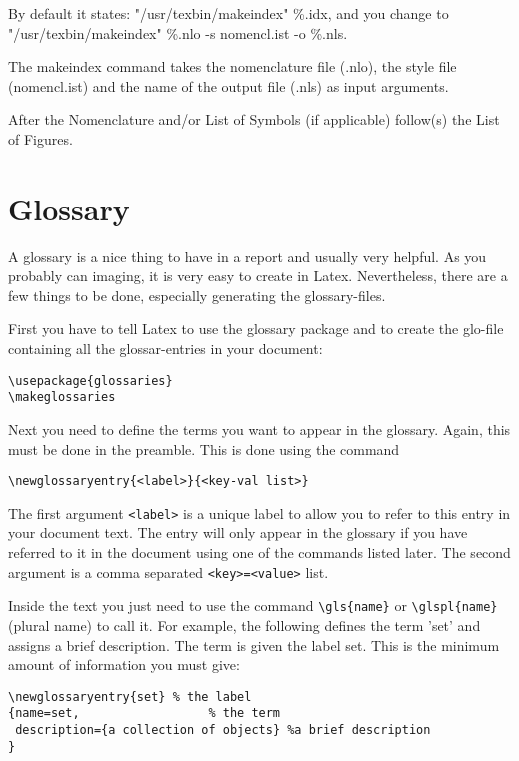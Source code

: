 By default it states:  "/usr/texbin/makeindex" \%.idx,  and you change to "/usr/texbin/makeindex" \%.nlo -s nomencl.ist -o \%.nls. 

\begin{sloppypar}
The makeindex command takes the nomenclature file (.nlo), the style file (nomencl.ist) and the name of the output file (.nls) as input arguments.
\end{sloppypar}

After the Nomenclature and/or List of Symbols (if applicable) follow(s) the List of Figures. 

\section{Glossary} %
\label{sec:glossary}

A glossary is a nice thing to have in a report and usually very helpful. As you probably can imaging, it is very easy to create in Latex. Nevertheless, there are a few things to be done, especially generating the glossary-files.

First you have to tell Latex to use the glossary package and to create the glo-file containing all the glossar-entries in your document:

\begin{verbatim}
\usepackage{glossaries} 
\makeglossaries
\end{verbatim}

Next you need to define the terms you want to appear in the glossary. Again, this must be done in the preamble. This is done using the command

\verb!\newglossaryentry{<label>}{<key-val list>}! 

The first argument \verb!<label>! is a unique label to allow you to refer to this entry in your document text. The entry will only appear in the glossary if you have referred to it in the document using one of the commands listed later. The second argument is a comma separated \verb!<key>=<value>! list.

Inside the text you just need to use the command \verb!\gls{name}! or \verb!\glspl{name}! (plural name) to call it. For example, the following defines the term 'set' and assigns a brief description. The term is given the label set. This is the minimum amount of information you must give:

\begin{verbatim}
\newglossaryentry{set} % the label
{name=set,            		% the term
 description={a collection of objects} %a brief description
}
 \end{verbatim}

